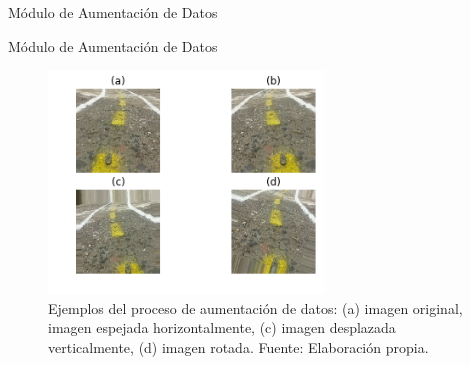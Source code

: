\documentclass[10pt]{beamer}
\begin{document}
\begin{frame}{Módulo de Aumentación de Datos}
    \begin{table}[!h]
        \centering
        \caption[Transformaciones realizadas en la aumentación de datos.]{Transformaciones realizadas en la aumentación de datos. Fuente: Elaboración propia.}
    \end{table}

\end{frame}

\begin{frame}{Módulo de Aumentación de Datos}
    \begin{figure}[!h] 
        \centering
        \includegraphics[width=0.65\textwidth]{../img/aumentacion}
        \caption[Ejemplos de aumentación de datos]{Ejemplos del proceso de aumentación de datos: (a) imagen original, 
        imagen espejada horizontalmente, (c) imagen desplazada verticalmente, (d) imagen rotada. Fuente: Elaboración propia. }
    \end{figure}

\end{frame}
\end{document}
